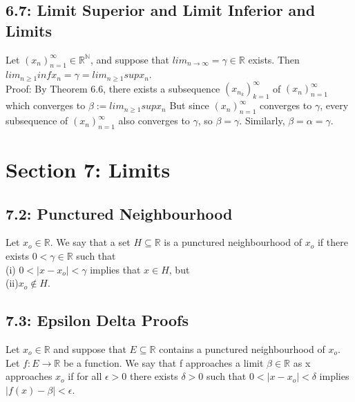 \documentclass[10pt,letter]{report}
\begin{document}
\section*{6.7: Limit Superior and Limit Inferior and Limits}
Let $(x_n)_{n=1}^\infty \in \mathbb{R}^\mathbb{N}$, and suppose that $lim_{n\rightarrow\infty} = \gamma \in \mathbb{R}$ exists. Then $lim_{n\geq 1}inf x_n = \gamma = lim_{n\geq 1}sup x_n$.\\ 
Proof: By Theorem 6.6, there exists a subsequence $(x_{n_k})_{k=1}^\infty$ of $(x_n)_{n=1}^\infty$ which converges to $\beta:= lim_{n\geq 1}supx_n$ But since $(x_n)_{n=1}^\infty$ converges to $\gamma$, every subsequence of $(x_n)_{n=1}^\infty$ also converges to $\gamma$, so $\beta = \gamma$. Similarly, $\beta = \alpha = \gamma$. 



\chapter*{Section 7: Limits}

\section*{7.2: Punctured Neighbourhood}
Let $x_o\in\mathbb{R}$. We say that a set $H \subseteq\mathbb{R}$ is a punctured neighbourhood of $x_o$ if there exists $0 < \gamma \in \mathbb{R}$ such that \\ 
(i) $0 < |x - x_o| < \gamma$ implies that $x \in H$, but\\
(ii)$x_o \not\in H$. \\ 

\section*{7.3: Epsilon Delta Proofs}
Let $x_o\in\mathbb{R}$ and suppose that $E\subseteq\mathbb{R}$ contains a punctured neighbourhood of $x_o$. Let $f: E\rightarrow\mathbb{R}$ be a function. We say that f approaches a limit $\beta\in\mathbb{R}$ as x approaches $x_o$ if for all $\epsilon>0$ there exists $\delta>0$ such that $0 < |x-x_o| < \delta$ implies $|f(x)-\beta| < \epsilon$. 
\end{document}
